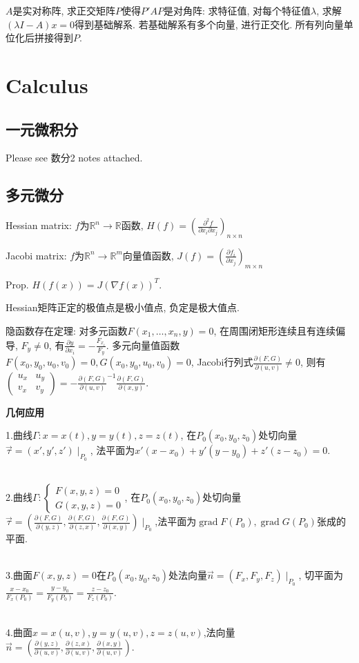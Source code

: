 \documentclass[UTF8]{ctexart}
\begin{document}
$A$是实对称阵, 求正交矩阵$P$使得$P'AP$是对角阵: 
求特征值, 对每个特征值$\lambda$, 求解$(\lambda I-A)x=0$得到基础解系.
若基础解系有多个向量, 进行正交化.
所有列向量单位化后拼接得到$P$.

\section{Calculus}

\subsection{一元微积分}
Please see 数分2 notes attached.


\subsection{多元微分}

Hessian matrix: $f$为$\mathbb{R}^n\to\mathbb{R}$函数,
$H(f)=\left(\frac{\partial^2 f}{\partial x_i \partial x_j}\right)_{n\times n}$

Jacobi matrix: $f$为$\mathbb{R}^n\to \mathbb{R}^m$向量值函数,
$J(f)=\left(\frac{\partial f_i}{\partial x_j}\right)_{m\times n}$

Prop. $H(f(x))=J(\nabla f(x))^T$.

Hessian矩阵正定的极值点是极小值点, 负定是极大值点.

隐函数存在定理:
对多元函数$F(x_1,\dots,x_n,y)=0$, 在周围闭矩形连续且有连续偏导, $F_y\neq 0$, 有$\frac{\partial y}{\partial x_i}=-\frac{F_{x_i}}{F_y}$.
多元向量值函数$F(x_0,y_0,u_0,v_0)=0, G(x_0,y_0,u_0,v_0)=0$, Jacobi行列式$\frac{\partial(F,G)}{\partial(u,v)}\neq 0$,
则有$\begin{pmatrix} u_x & u_y \\ v_x  & v_y \end{pmatrix} = -\frac{\partial(F,G)}{\partial(u,v)} ^{-1}\frac{\partial(F,G)}{\partial(x,y)}$.


\noindent \textbf{几何应用}

\noindent 1.曲线$\Gamma: x=x(t),y=y(t),z=z(t)$,
    在$P_0(x_0,y_0,z_0)$处切向量$\vec{\tau}=(x',y',z')\mid _{P_0}$,
    法平面为$x'(x-x_0)+y'(y-y_0)+z'(z-z_0)= 0$.\par 
~\\
\noindent 2.曲线$\Gamma: \left\{\begin{array}{l}
    F(x, y, z)=0 \\ G(x, y, z)=0 \end{array}\right.$,
    在$P_0(x_0,y_0,z_0)$处切向量$\vec{\tau}=(\frac{\partial (F,G)}{\partial (y,z)},
    \frac{\partial (F,G)}{\partial (z,x)}, \frac{\partial (F,G)}{\partial (x,y)})
    \mid _{P_0}$,法平面为$\operatorname{grad}F(P_0),\operatorname{grad}G(P_0)$张成的平面.\par 
~\\
\noindent 3.曲面$F(x,y,z)=0$在$P_0(x_0,y_0,z_0)$处法向量$\vec{n}=(F_x,F_y,F_z)\mid _{P_0}$,
    切平面为$\frac{x-x_0}{F_x(P_0)}=\frac{y-y_0}{F_y(P_0)}=\frac{z-z_0}{F_z(P_0)}$.\par 
~\\
\noindent 4.曲面$x=x(u,v),y=y(u,v),z=z(u,v)$,法向量$\vec{n}=(
    \frac{\partial (y,z)}{\partial (u,v)},\frac{\partial (z,x)}{\partial (u,v)},\frac{\partial (x,y)}{\partial (u,v)})$.
\end{document}

